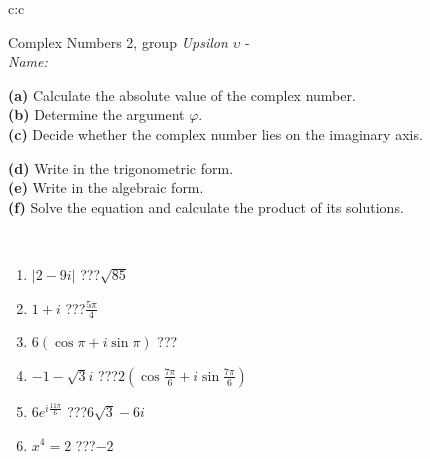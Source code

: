 \documentclass[10pt]{report}
\begin{document}
\newpage
\thispagestyle{empty}
\begin{tabular}{c:c}
\begin{minipage}[c][104.5mm][t]{0.5\linewidth}
\begin{center}
\vspace{5mm}
{\huge Complex Numbers 2, group \textit{Upsilon $\upsilon$} -}\\[5mm]
\textit{Name:}\phantom{xxxxxxxxxxxxxxxxxxxxxxxxxxxxxxxxxxxxxxxxxxxxxxxxxxxxxxxxxxxxxxxxx}\\[5mm]
\begin{minipage}{0.95\linewidth}
\begin{center}
{\small \begin{minipage}{0.44\textwidth} \raggedright
\textbf{(a)} Calculate the absolute value of the complex number. \\[1mm]
\textbf{(b)} Determine the argument \(\varphi\). \\[1mm]
\textbf{(c)} Decide whether the complex number lies on the imaginary axis. \end{minipage} \begin{minipage}{0.54\textwidth}
\textbf{(d)} Write in the trigonometric form. \\[1mm]
\textbf{(e)} Write in the algebraic form. \\[1mm]
\textbf{(f)} Solve the equation and calculate the product of its solutions.
\end{minipage}
}
\end{center}
\end{minipage}
\\[1mm]
\begin{minipage}{0.79\linewidth}
\begin{center}
\begin{varwidth}{\linewidth}
\setlength{\itemsep}{0pt}
\begin{enumerate}
\large
\item $|2-9i|$\quad \dotfill\; ???\;\dotfill \quad $\sqrt{85}$
\item $1+i$\quad \dotfill\; ???\;\dotfill \quad $\frac{5\pi}{4}$
\item $6\left(\cos{\pi}+i\sin{\pi}\right)$\quad \dotfill\; ???\;\dotfill \quad {}
\item $-1-\sqrt{3}i$\quad \dotfill\; ???\;\dotfill \quad $2\left(\cos{\frac{7\pi}{6}}+i\sin{\frac{7\pi}{6}}\right)$
\item $6e^{i\frac{11\pi}{6}}$\quad \dotfill\; ???\;\dotfill \quad $6\sqrt{3}-6i$
\item $x^4=2$\quad \dotfill\; ???\;\dotfill \quad $-2$

\end{enumerate}
\end{varwidth}
\end{center}
\end{minipage}
\end{center}
\end{minipage}
\end{tabular}
\end{document}
